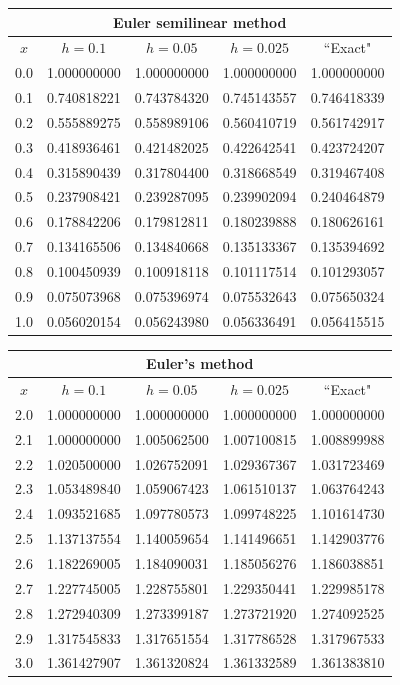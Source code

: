 \documentclass[dvips]{book}
\renewcommand{\exer}[1]{\par\medskip\;\noindent{\color{red}\bf #1.}}
\numberwithin{example}{section}
\numberwithin{equation}{section}
\numberwithin{theorem}{section}
\numberwithin{table}{section}
\numberwithin{figure}{section}
\begin{document}
{\small
\begin{tabular}{|c|r|r|r|r|}
\hline
\multicolumn{5}{|c|}{Euler semilinear method}\\\hline
\multicolumn{1}{|c|}{$x$}&
\multicolumn{1}{|c|}{$h=0.1$}&
\multicolumn{1}{|c|}{$h=0.05$}&
\multicolumn{1}{|c|}{$h=0.025$}&
\multicolumn{1}{|c|}{``Exact"}\\ \hline
0.0 & 1.000000000 & 1.000000000 & 1.000000000 & 1.000000000 \\
0.1 & 0.740818221 & 0.743784320 & 0.745143557 & 0.746418339 \\
0.2 & 0.555889275 & 0.558989106 & 0.560410719 & 0.561742917 \\
0.3 & 0.418936461 & 0.421482025 & 0.422642541 & 0.423724207 \\
0.4 & 0.315890439 & 0.317804400 & 0.318668549 & 0.319467408 \\
0.5 & 0.237908421 & 0.239287095 & 0.239902094 & 0.240464879 \\
0.6 & 0.178842206 & 0.179812811 & 0.180239888 & 0.180626161 \\
0.7 & 0.134165506 & 0.134840668 & 0.135133367 & 0.135394692 \\
0.8 & 0.100450939 & 0.100918118 & 0.101117514 & 0.101293057 \\
0.9 & 0.075073968 & 0.075396974 & 0.075532643 & 0.075650324 \\
1.0 & 0.056020154 & 0.056243980 & 0.056336491 & 0.056415515 \\
\hline
\end{tabular}}


\exer{3.1.22}
{\small
\begin{tabular}{|c|r|r|r|r|}
\hline
\multicolumn{5}{|c|}{Euler's method}\\\hline
\multicolumn{1}{|c|}{$x$}&
\multicolumn{1}{|c|}{$h=0.1$}&
\multicolumn{1}{|c|}{$h=0.05$}&
\multicolumn{1}{|c|}{$h=0.025$}&
\multicolumn{1}{|c|}{``Exact"}\\ \hline
2.0 & 1.000000000 & 1.000000000 & 1.000000000 & 1.000000000 \\
2.1 & 1.000000000 & 1.005062500 & 1.007100815 & 1.008899988 \\
2.2 & 1.020500000 & 1.026752091 & 1.029367367 & 1.031723469 \\
2.3 & 1.053489840 & 1.059067423 & 1.061510137 & 1.063764243 \\
2.4 & 1.093521685 & 1.097780573 & 1.099748225 & 1.101614730 \\
2.5 & 1.137137554 & 1.140059654 & 1.141496651 & 1.142903776 \\
2.6 & 1.182269005 & 1.184090031 & 1.185056276 & 1.186038851 \\
2.7 & 1.227745005 & 1.228755801 & 1.229350441 & 1.229985178 \\
2.8 & 1.272940309 & 1.273399187 & 1.273721920 & 1.274092525 \\
2.9 & 1.317545833 & 1.317651554 & 1.317786528 & 1.317967533 \\
3.0 & 1.361427907 & 1.361320824 & 1.361332589 & 1.361383810 \\
\hline
\end{tabular}}
\medskip
\end{document}
